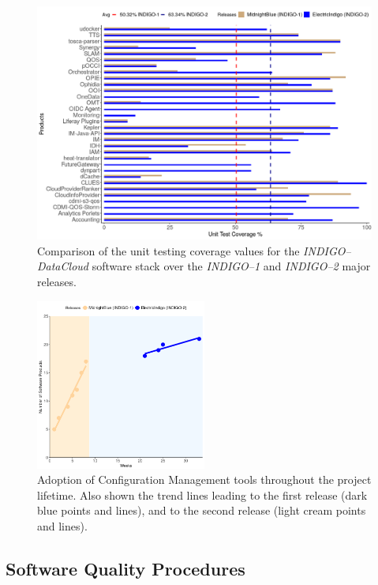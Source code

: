 \documentclass[journal]{IEEEtran}
\begin{document}
\begin{figure}[ht]
\centering
\includegraphics[width=\textwidth]{images/fig2.png}
\caption{Comparison of the unit testing coverage values for the {\sl INDIGO--DataCloud}
software stack over the {\sl INDIGO--1} and {\sl INDIGO--2} major releases.}
\label{fig:fig_unittest}
\end{figure}

\begin{figure}[ht]
\centering
\includegraphics[width=0.5\textwidth]{images/fig3.png}
\caption{Adoption of Configuration Management tools throughout the project lifetime. Also shown the trend lines
leading to the first release (dark blue points and lines), and to the second release (light cream points and lines).}
\label{fig:fig_confman}
\end{figure}

\subsection{Software Quality Procedures}
\label{subsec:sqa}
\end{document}
